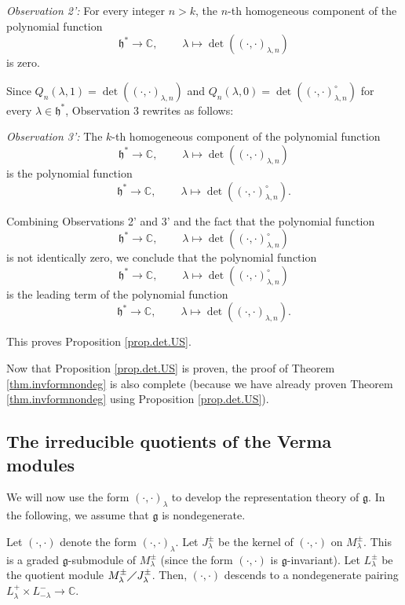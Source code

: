 \documentclass[etingof-lie.tex]{subfiles}
\begin{document}
\textit{Observation 2':} For every integer $n>k$, the $n$-th homogeneous
component of the polynomial function%
\[
\mathfrak{h}^{\ast}\rightarrow\mathbb{C},\ \ \ \ \ \ \ \ \ \ \lambda
\mapsto\det\left(  \left(  \cdot,\cdot\right)  _{\lambda,n}\right)
\]
is zero.

Since $Q_{n}\left(  \lambda,1\right)  =\det\left(  \left(  \cdot,\cdot\right)
_{\lambda,n}\right)  $ and $Q_{n}\left(  \lambda,0\right)  =\det\left(
\left(  \cdot,\cdot\right)  _{\lambda,n}^{\circ}\right)  $ for every
$\lambda\in\mathfrak{h}^{\ast}$, Observation 3 rewrites as follows:

\textit{Observation 3':} The $k$-th homogeneous component of the polynomial
function%
\[
\mathfrak{h}^{\ast}\rightarrow\mathbb{C},\ \ \ \ \ \ \ \ \ \ \lambda
\mapsto\det\left(  \left(  \cdot,\cdot\right)  _{\lambda,n}\right)
\]
is the polynomial function%
\[
\mathfrak{h}^{\ast}\rightarrow\mathbb{C},\ \ \ \ \ \ \ \ \ \ \lambda
\mapsto\det\left(  \left(  \cdot,\cdot\right)  _{\lambda,n}^{\circ}\right)  .
\]


Combining Observations 2' and 3' and the fact that the polynomial function
\[
\mathfrak{h}^{\ast}\rightarrow\mathbb{C},\ \ \ \ \ \ \ \ \ \ \lambda
\mapsto\det\left(  \left(  \cdot,\cdot\right)  _{\lambda,n}^{\circ}\right)
\]
is not identically zero, we conclude that the polynomial function%
\[
\mathfrak{h}^{\ast}\rightarrow\mathbb{C},\ \ \ \ \ \ \ \ \ \ \lambda
\mapsto\det\left(  \left(  \cdot,\cdot\right)  _{\lambda,n}^{\circ}\right)
\]
is the leading term of the polynomial function%
\[
\mathfrak{h}^{\ast}\rightarrow\mathbb{C},\ \ \ \ \ \ \ \ \ \ \lambda
\mapsto\det\left(  \left(  \cdot,\cdot\right)  _{\lambda,n}\right)  .
\]


This proves Proposition \ref{prop.det.US}.

Now that Proposition \ref{prop.det.US} is proven, the proof of Theorem
\ref{thm.invformnondeg} is also complete (because we have already proven
Theorem \ref{thm.invformnondeg} using Proposition \ref{prop.det.US}).

\subsection{The irreducible quotients of the Verma modules}

We will now use the form $\left(  \cdot,\cdot\right)  _{\lambda}$ to develop
the representation theory of $\mathfrak{g}$. In the following, we assume that
$\mathfrak{g}$ is nondegenerate.

\begin{definition}
Let $\left(  \cdot,\cdot\right)  $ denote the form $\left(  \cdot
,\cdot\right)  _{\lambda}$. Let $J_{\lambda}^{\pm}$ be the kernel of $\left(
\cdot,\cdot\right)  $ on $M_{\lambda}^{\pm}$. This is a graded $\mathfrak{g}%
$-submodule of $M_{\lambda}^{\pm}$ (since the form $\left(  \cdot
,\cdot\right)  $ is $\mathfrak{g}$-invariant). Let $L_{\lambda}^{\pm}$ be the
quotient module $M_{\lambda}^{\pm}\diagup J_{\lambda}^{\pm}$. Then, $\left(
\cdot,\cdot\right)  $ descends to a nondegenerate pairing $L_{\lambda}%
^{+}\times L_{-\lambda}^{-}\rightarrow\mathbb{C}$.
\end{definition}
\end{document}
